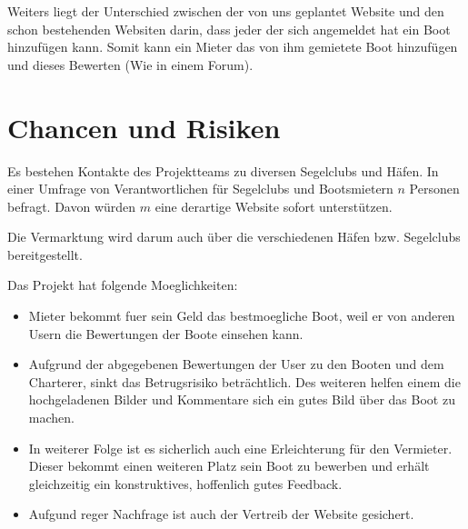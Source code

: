 \documentclass[12pt]{article}
\theoremstyle{definition}
\begin{document}
Weiters liegt der Unterschied zwischen der von uns geplantet Website und den schon bestehenden Websiten darin, dass jeder der sich angemeldet hat ein Boot hinzufügen kann. Somit kann ein Mieter das von ihm gemietete Boot hinzufügen und dieses Bewerten (Wie in einem Forum).

\pagebreak

\section{Chancen und Risiken}
Es bestehen Kontakte des Projektteams zu diversen Segelclubs und Häfen. In einer Umfrage von Verantwortlichen für Segelclubs und Bootsmietern $n$ Personen befragt. Davon würden $m$ eine derartige Website sofort unterstützen. 

Die Vermarktung wird  darum auch über die verschiedenen Häfen bzw. Segelclubs bereitgestellt.

Das Projekt hat folgende Moeglichkeiten:
\begin{itemize}
\item Mieter bekommt fuer sein Geld das bestmoegliche Boot, weil er von anderen Usern die Bewertungen der Boote einsehen kann.
\item Aufgrund der abgegebenen Bewertungen der User zu den Booten und dem Charterer, sinkt das Betrugsrisiko beträchtlich. Des weiteren helfen einem die hochgeladenen Bilder und Kommentare sich ein gutes Bild über das Boot zu machen.
\item In weiterer Folge ist es sicherlich auch eine Erleichterung für den Vermieter. Dieser bekommt einen weiteren Platz sein Boot zu bewerben und erhält gleichzeitig ein konstruktives, hoffenlich gutes Feedback.
\item Aufgund reger Nachfrage ist auch der Vertreib der Website gesichert.
\end{itemize}
\end{document}
